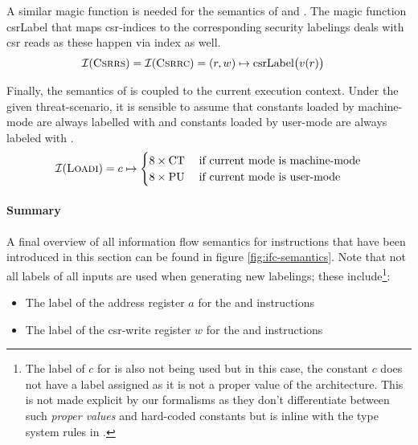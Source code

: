 A similar magic function is needed for the semantics of  and .
The magic function \mbox{csrLabel} that maps \gls{csr}-indices to the corresponding security labelings deals with \gls{csr} reads as these happen via index as well.
\begin{align*}
    \mathcal{I}(\textsc{Csrrs}) = \mathcal{I}(\textsc{Csrrc}) &= (r, w) \mapsto \text{csrLabel}\big(v(r) \big)
\end{align*}

Finally, the semantics of  is coupled to the current execution context.
Under the given threat-scenario, it is sensible to assume that constants loaded by machine-mode are always labelled with \CT{} and constants loaded by user-mode are always labeled with \PU{}.
\begin{equation*}
    \mathcal{I}(\textsc{Loadi}) = c \mapsto \begin{cases}
        8 \times \text{CT} & \; \text{if current mode is machine-mode} \\
        8 \times \text{PU} & \; \text{if current mode is user-mode}
    \end{cases}
\end{equation*}


\paragraph{Summary}
A final overview of all information flow semantics for instructions that have been introduced in this section can be found in figure \ref{fig:ifc-semantics}.
Note that not all labels of all inputs are used when generating new labelings; these include\footnote{%
    The label of $ c $ for  is also not being used but in this case, the constant $ c $ does not have a label assigned as it is not a proper value of the architecture.
    This is not made explicit by our formalisms as they don't differentiate between such \textit{proper values} and hard-coded constants but is inline with the type system rules in \cite{Ferraiuolo17}.
}:
\begin{itemize}
    \item The label of the address register $ a $ for the  and  instructions
    \item The label of the \gls{csr}-write register $ w $ for the  and  instructions
\end{itemize}

